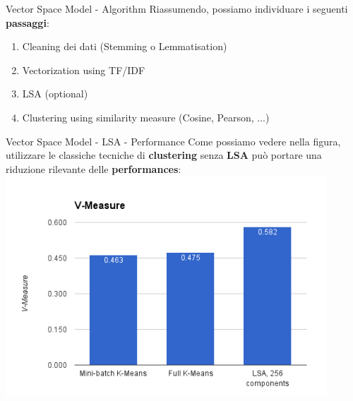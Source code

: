 \documentclass[british]{beamer}
\begin{document}
\begin{frame}{Vector Space Model - Algorithm}
	Riassumendo, possiamo individuare i seguenti \textbf{passaggi}:
	\begin{enumerate}
		\item Cleaning dei dati (Stemming o Lemmatisation)
		\item Vectorization using TF/IDF
		\item LSA (optional)
		\item Clustering using similarity measure (Cosine, Pearson, ...)
	\end{enumerate}
\end{frame}

\begin{frame}{Vector Space Model - LSA - Performance}
	Come possiamo vedere nella figura, utilizzare le classiche tecniche di \textbf{clustering} senza \textbf{LSA} pu\`{o} portare una riduzione rilevante delle \textbf{performances}:
	\includegraphics[width=0.9\textwidth, height=0.7\textheight]{./Imgs/LSAperf}
\end{frame}
\end{document}
